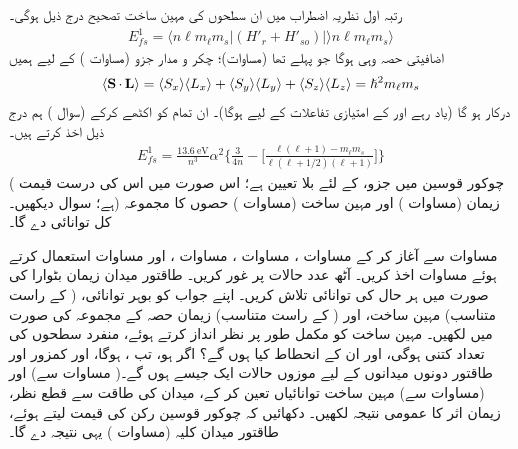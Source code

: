  رتبہ اول نظریہ اضطراب میں ان سطحوں کی مہین ساخت تصحیح درج ذیل ہوگی۔
\begin{align}\label{مساوات_غیر_مضطرب_نظریہ_اضطراب_پہلی_تصحیح}
E_{fs}^1 = \langle n\ell m_{\ell} m_s | (H'_r + H'_{so}) | \rangle n\ell m_{\ell} m_s \rangle
\end{align}
اضافیتی حصہ وہی ہوگا جو پہلے تھا (مساوات)؛ چکر و مدار جزو (مساوات ) کے لیے ہمیں
\begin{align}\label{مساوات_غیر_مضطرب_نقطی_ضرب}
\langle \operatorname{\mathbf{S}} \cdot \operatorname{\mathbf{L}} \rangle = \langle S_x \rangle \langle L_x \rangle + \langle S_y \rangle \langle L_y \rangle + \langle S_z \rangle \langle L_z \rangle = \hslash^2 m_{\ell} m_s
\end{align}
درکار ہو گا (یاد رہے  اور  کے امتیازی تفاعلات کے لیے  ہوگا)۔ ان تمام کو اکٹھے کرکے (سوال ) ہم درج ذیل اخذ کرتے ہیں۔
\begin{align}\label{مساوت_غیر_مضطرب_طاقتور_مہین_ساخت_حصہ}
E_{fs}^1 = \frac{\SI{13.6}{\electronvolt}}{n^3} \alpha^2 \Big \{ \frac{3}{4n} - \Big [ \frac{\ell (\ell + 1) - m_\ell m_s}{\ell (\ell + 1/2)(\ell + 1)} \Big ] \Big\}
\end{align}
( چوکور قوسین میں جزو،  کے لئے بلا تعیین ہے؛ اس صورت میں اس کی درست قیمت  ہے؛ سوال  دیکھیں۔) زیمان (مساوات ) اور مہین ساخت (مساوات ) حصوں کا مجموعہ کل توانائی دے گا۔
 
مساوات  سے آغاز کر کے مساوات ، مساوات ، مساوات ، اور مساوات  استعمال کرتے ہوئے مساوات اخذ کریں۔
آٹھ عدد  حالات  پر غور کریں۔ طاقتور میدان زیمان بٹوارا کی صورت میں ہر حال کی توانائی تلاش کریں۔ اپنے جواب کو بوہر توانائی، (  کے راست متناسب) مہین ساخت، اور (  کے راست متناسب) زیمان حصہ کے مجموعہ کی صورت میں لکھیں۔ مہین ساخت کو مکمل طور پر نظر انداز کرتے ہوئے، منفرد سطحوں کی تعداد کتنی ہوگی، اور ان کے انحطاط کیا ہوں گے؟ 
اگر  ہو، تب ،  ہوگا، اور کمزور اور طاقتور دونوں میدانوں کے لیے موزوں حالات  ایک جیسے ہوں گے۔( مساوات  سے)  اور (مساوات  سے) مہین ساخت توانائیاں تعین کر کے، میدان کی طاقت سے قطع نظر،  زیمان اثر کا عمومی نتیجہ لکھیں۔ دکھائیں کہ چوکور قوسین رکن کی قیمت  لیتے ہوئے، طاقتور میدان کلیہ (مساوات ) یہی نتیجہ دے گا۔


